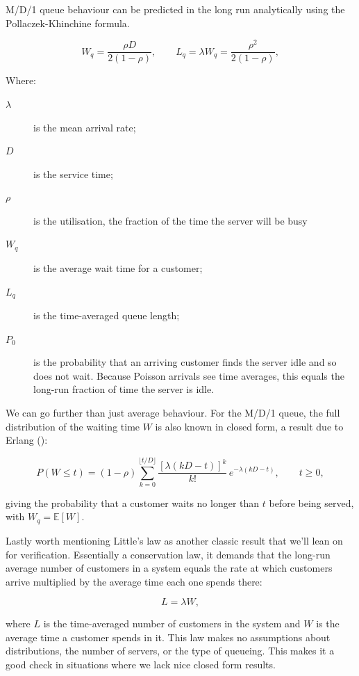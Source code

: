 \documentclass[a4paper, 10.5pt, oneside]{report}
\begin{document}
M/D/1 queue behaviour can be predicted in the long run analytically using the Pollaczek-Khinchine
formula.

\begin{equation}
  W_q = \frac{\rho D}{2(1-\rho)}, \qquad L_q = \lambda W_q = \frac{\rho^2}{2(1-\rho)},
  \label{eq:md1}
\end{equation}

Where:

\begin{description}
  \item[$\lambda$] is the mean arrival rate;
  \item[$D$] is the service time;
  \item[$\rho$] is the utilisation, the fraction of the time the server will be busy
  \item[$W_q$] is the average wait time for a customer;
  \item[$L_q$] is the time-averaged queue length;
  \item[$P_0$] is the probability that an arriving customer finds the server idle
    and so does not wait. Because Poisson arrivals see time averages, this
    equals the long-run fraction of time the server is idle.
\end{description}

We can go further than just average behaviour. For the M/D/1 queue, the full
distribution of the waiting time $W$ is also known in closed form, a result due to Erlang (\cite{franx_simple_2001}):

\begin{equation}
  P(W \le t) = (1-\rho) \sum_{k=0}^{\lfloor t/D \rfloor}
    \frac{\left[\lambda (kD - t)\right]^k}{k!}\, e^{-\lambda (kD - t)},
    \qquad t \ge 0,
  \label{eq:md1cdf}
\end{equation}

giving the probability that a customer waits no longer than $t$ before being served,
with $W_q = \mathbb{E}[W]$.


Lastly worth mentioning Little's law as another classic result that we'll lean on for verification.
Essentially a conservation law, it demands that the long-run average number of customers in a system
equals the rate at which customers arrive multiplied by the average time each one spends there:

\begin{equation}
  L = \lambda W,
\end{equation}

where $L$ is the time-averaged number of customers in the system and $W$ is the average time a customer
spends in it. This law makes no assumptions about distributions, the number of servers, or the type of
queueing. This makes it a good check in situations where we lack nice closed form results.
\end{document}
